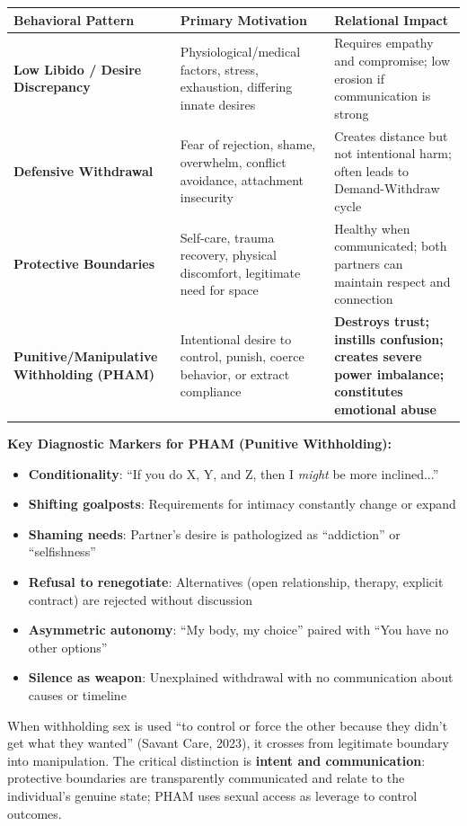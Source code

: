 \documentclass[12pt,openany]{book}
\numberwithin{equation}{chapter}
\begin{document}
\begin{center}
\begin{tabular}{|p{2.2in}|p{1.8in}|p{2in}|}
\hline
\textbf{Behavioral Pattern} & \textbf{Primary Motivation} & \textbf{Relational Impact} \\
\hline
\textbf{Low Libido / Desire Discrepancy} & Physiological/medical factors, stress, exhaustion, differing innate desires & Requires empathy and compromise; low erosion if communication is strong \\
\hline
\textbf{Defensive Withdrawal} & Fear of rejection, shame, overwhelm, conflict avoidance, attachment insecurity & Creates distance but not intentional harm; often leads to Demand-Withdraw cycle \\
\hline
\textbf{Protective Boundaries} & Self-care, trauma recovery, physical discomfort, legitimate need for space & Healthy when communicated; both partners can maintain respect and connection \\
\hline
\textbf{Punitive/Manipulative Withholding (PHAM)} & Intentional desire to control, punish, coerce behavior, or extract compliance & \textbf{Destroys trust; instills confusion; creates severe power imbalance; constitutes emotional abuse} \\
\hline
\end{tabular}
\end{center}

\textbf{Key Diagnostic Markers for PHAM (Punitive Withholding):}

\begin{itemize}
    \item \textbf{Conditionality}: ``If you do X, Y, and Z, then I \textit{might} be more inclined...''
    \item \textbf{Shifting goalposts}: Requirements for intimacy constantly change or expand
    \item \textbf{Shaming needs}: Partner's desire is pathologized as ``addiction'' or ``selfishness''
    \item \textbf{Refusal to renegotiate}: Alternatives (open relationship, therapy, explicit contract) are rejected without discussion
    \item \textbf{Asymmetric autonomy}: ``My body, my choice'' paired with ``You have no other options''
    \item \textbf{Silence as weapon}: Unexplained withdrawal with no communication about causes or timeline
\end{itemize}

When withholding sex is used ``to control or force the other because they didn't get what they wanted'' (Savant Care, 2023), it crosses from legitimate boundary into manipulation. The critical distinction is \textbf{intent and communication}: protective boundaries are transparently communicated and relate to the individual's genuine state; PHAM uses sexual access as leverage to control outcomes.
\end{document}

